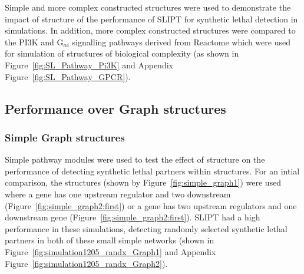Simple and more complex constructed  structures were used to demonstrate the impact of  structure of the performance of \gls{SLIPT} for \gls{synthetic lethal} detection in simulations. In addition, more complex constructed  structures were compared to the PI3K and G$_{\alpha i}$ signalling pathways derived from Reactome which were used for simulation of  structures of biological complexity (as shown in Figure~\ref{fig:SL_Pathway_Pi3K} and Appendix Figure~\ref{fig:SL_Pathway_GPCR}).

\FloatBarrier

\subsection{Performance over Graph structures}
\label{chapt5:graphsim_performance}

\subsubsection{Simple Graph structures}
\label{chapt5:graphsim_performance_simple}

\FloatBarrier

Simple pathway modules were used to test the effect of  structure on the performance of detecting \gls{synthetic lethal} partners within  structures. For an intial comparison, the  structures (shown by Figure~\ref{fig:simple_graph1}) were used where a gene has one upstream regulator and two downstream (Figure~\ref{fig:simple_graph2:first}) or a gene has two upstream regulators and one downstream gene (Figure~\ref{fig:simple_graph2:first}). \gls{SLIPT} had a high performance in these simulations, detecting randomly selected \gls{synthetic lethal} partners in both of these small simple networks (shown in Figure~\ref{fig:simulation1205_randx_Graph1} and Appendix Figure~\ref{fig:simulation1205_randx_Graph2}). 

